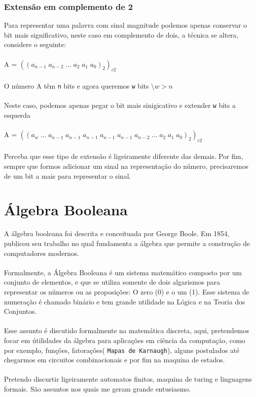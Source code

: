 \documentclass[12pt, onecolumn]{article}
\begin{document}
		\subsubsection{Extensão em complemento de 2}
	Para representar uma palavra com sinal magnitude
	podemos apenas conservar o bit mais significativo, neste caso
	em complemento de dois, a técnica se altera, considere o seguinte:\\
	\\
	A = $((a_{n-1} \; a_{n-2} \; ... \; a_{2} \; a_{1} \; a_{0})_2)_{c2}$\\
	\\
	O número A têm \texttt{n} bits e agora queremos \texttt{w} bits
	$\setminus w > n$\\
	\\
	Neste caso, podemos apenas pegar o bit mais sinigicativo e extender
	\texttt{w} bits a esquerda\\
	\\
	A = $((a_{w} \; ... \;a_{n-1}\;a_{n-1}\;a_{n-1}\;a_{n-1}\;a_{n-1} 
	\; a_{n-2} \; ... \; a_{2} \; a_{1} \; a_{0})_2)_{c2}$\\
	\\
	Perceba que esse tipo de extensão é ligeiramente diferente das demais.
	Por fim, sempre que formos adicionar um sinal na representação do
	número, precisaremos de um bit a mais para representar o sinal.

		\section{Álgebra Booleana}

	A álgebra booleana foi descrita e conceituada por George Boole. 
	Em 1854, publicou seu trabalho no qual fundamenta a álgebra que 
	permite a construção de computadores modernos.\\
	\\
	Formalmente, a Álgebra Booleana é um sistema matemático composto 
	por um conjunto de elementos, e que se utiliza somente de dois 
	algarismos para representar os números ou as proposições: 
	O zero (0) e o um (1). Esse sistema de numeração é chamado binário 
	e tem grande utilidade na Lógica e na Teoria dos Conjuntos.\\
	\\
	Esse assunto é discutido formalmente na matemática discreta, 
	aqui, pretendemos focar em útilidades da álgebra para aplicações
	em ciência da computação, como por exemplo, funções, fatorações( 
	\texttt{Mapas de Karnaugh}), alguns postulados até chegarmos em 
	circuitos combinacionais e por fim na maquina de estados.\\
	\\
	Pretendo discurtir ligeiramente automatos finitos, maquina de turing 
	e linguagens formais. São assuntos nos quais me geram 
	grande entusiasmo.\\
\end{document}
